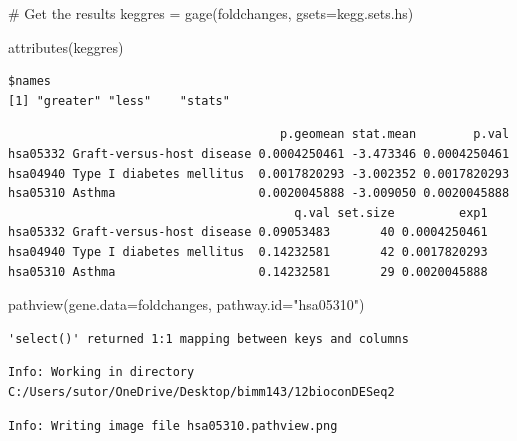 \documentclass[
  letterpaper,
  DIV=11,
  numbers=noendperiod]{scrartcl}
\newenvironment{Shaded}{\begin{snugshade}}{\end{snugshade}}
\newcommand{\AttributeTok}[1]{\textcolor[rgb]{0.40,0.45,0.13}{#1}}
\newcommand{\CommentTok}[1]{\textcolor[rgb]{0.37,0.37,0.37}{#1}}
\newcommand{\DecValTok}[1]{\textcolor[rgb]{0.68,0.00,0.00}{#1}}
\newcommand{\FunctionTok}[1]{\textcolor[rgb]{0.28,0.35,0.67}{#1}}
\newcommand{\NormalTok}[1]{\textcolor[rgb]{0.00,0.23,0.31}{#1}}
\newcommand{\OtherTok}[1]{\textcolor[rgb]{0.00,0.23,0.31}{#1}}
\newcommand{\SpecialCharTok}[1]{\textcolor[rgb]{0.37,0.37,0.37}{#1}}
\newcommand{\StringTok}[1]{\textcolor[rgb]{0.13,0.47,0.30}{#1}}
\begin{document}
\begin{Shaded}
\begin{Highlighting}[]
\CommentTok{\# Get the results}
\NormalTok{keggres }\OtherTok{=} \FunctionTok{gage}\NormalTok{(foldchanges, }\AttributeTok{gsets=}\NormalTok{kegg.sets.hs)}
\end{Highlighting}
\end{Shaded}

\begin{Shaded}
\begin{Highlighting}[]
\FunctionTok{attributes}\NormalTok{(keggres)}
\end{Highlighting}
\end{Shaded}

\begin{verbatim}
$names
[1] "greater" "less"    "stats"  
\end{verbatim}

\begin{Shaded}
\end{Shaded}

\begin{verbatim}
                                      p.geomean stat.mean        p.val
hsa05332 Graft-versus-host disease 0.0004250461 -3.473346 0.0004250461
hsa04940 Type I diabetes mellitus  0.0017820293 -3.002352 0.0017820293
hsa05310 Asthma                    0.0020045888 -3.009050 0.0020045888
                                        q.val set.size         exp1
hsa05332 Graft-versus-host disease 0.09053483       40 0.0004250461
hsa04940 Type I diabetes mellitus  0.14232581       42 0.0017820293
hsa05310 Asthma                    0.14232581       29 0.0020045888
\end{verbatim}

\begin{Shaded}
\begin{Highlighting}[]
\FunctionTok{pathview}\NormalTok{(}\AttributeTok{gene.data=}\NormalTok{foldchanges, }\AttributeTok{pathway.id=}\StringTok{"hsa05310"}\NormalTok{)}
\end{Highlighting}
\end{Shaded}

\begin{verbatim}
'select()' returned 1:1 mapping between keys and columns
\end{verbatim}

\begin{verbatim}
Info: Working in directory C:/Users/sutor/OneDrive/Desktop/bimm143/12bioconDESeq2
\end{verbatim}

\begin{verbatim}
Info: Writing image file hsa05310.pathview.png
\end{verbatim}
\end{document}
